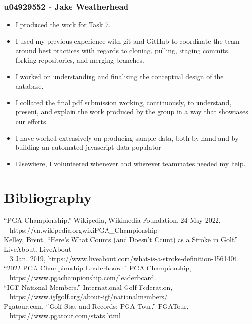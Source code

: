 \documentclass[titlepage]{article}
\begin{document}
\subsubsection*{u04929552 - Jake Weatherhead}
\vspace{1em}
\begin{itemize}
  \item I produced the work for Task 7.
  \item I used my previous experience with git and GitHub to coordinate the team around best practices with regards to cloning, 
        pulling, staging commits, forking repositories, and merging branches.
  \item I worked on understanding and finalising the conceptual design of the database.
  \item I collated the final pdf submission working, continuously, to understand, present, and explain the work produced
        by the group in a way that showcases our efforts.
  \item I have worked extensively on producing sample data, both by hand and by building an automated javascript data populator.
  \item Elsewhere, I volunteered whenever and wherever teammates needed my help.
\end{itemize}

\newpage
\section{Bibliography}
\vspace{2em}
“PGA Championship.” Wikipedia, Wikimedia Foundation, 24 May 2022, \\
\-\ \hspace{15pt} https://en.wikipedia.org\/wiki\/PGA\_Championship \\

\noindent
Kelley, Brent. “Here's What Counts (and Doesn't Count) as a Stroke in Golf.” LiveAbout, LiveAbout, \\
\-\ \hspace{15pt} 3 Jan. 2019, https://www.liveabout.com/what-is-a-stroke-definition-1561404. \\

\noindent
“2022 PGA Championship Leaderboard.” PGA Championship, \\
\-\ \hspace{15pt} https://www.pgachampionship.com/leaderboard. \\

\noindent
“IGF National Members.” International Golf Federation, \\ 
\-\ \hspace{15pt} https://www.igfgolf.org/about-igf/nationalmembers/ \\ 

\noindent
Pgatour.com. “Golf Stat and Records: PGA Tour.” PGATour, \\
\-\ \hspace{15pt} https://www.pgatour.com/stats.html \\
\end{document}
